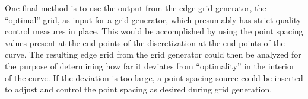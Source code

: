 One final method is to use the output from the edge grid generator, the 
``optimal'' grid, as input for a grid generator, which presumably has 
strict quality control measures in place.  This would be accomplished by 
using the point spacing values present at the end points of the 
discretization at the end points of the curve.  The resulting edge grid 
from the grid generator could then be analyzed for the purpose of 
determining how far it deviates from ``optimality'' in the interior of the 
curve.  
If the deviation is too large, a point spacing source could be inserted to 
adjust and control the point spacing as desired during grid generation.
